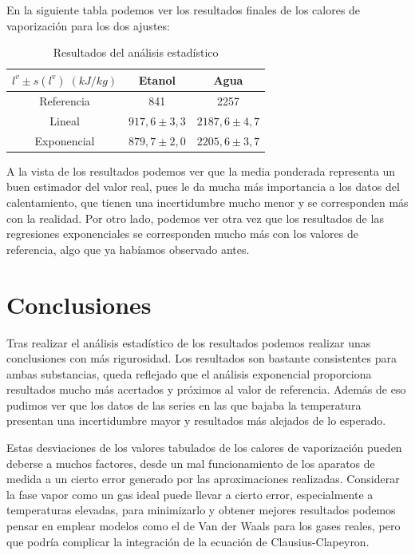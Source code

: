 \documentclass[a4paper,12pt,titlepage]{article}
\begin{document}
En la siguiente tabla podemos ver los resultados finales de los calores de vaporización para los dos ajustes:

\begin{table}[h!]
\centering
\begin{tabular}{|c|c|c|}
\hline
$l^v \pm s(l^v)\; (kJ/kg)$ & Etanol & Agua \\ \hline
Referencia       & 841 & 2257 \\ \hline
Lineal           & $917,6 \pm 3,3$ & $2187,6 \pm 4,7$ \\ \hline
Exponencial      & $879,7 \pm 2,0$ & $2205,6 \pm 3,7$ \\ \hline
\end{tabular}
\caption{Resultados del análisis estadístico}
\label{tab:my-table}
\end{table}

A la vista de los resultados podemos ver que la media ponderada representa un buen estimador del valor real, pues le da mucha más importancia a los datos del calentamiento, que tienen una incertidumbre mucho menor y se corresponden más con la realidad. Por otro lado, podemos ver otra vez que los resultados de las regresiones exponenciales se corresponden mucho más con los valores de referencia, algo que ya habíamos observado antes.


\section{Conclusiones}

Tras realizar el análisis estadístico de los resultados podemos realizar unas conclusiones con más rigurosidad. Los resultados son bastante consistentes para ambas substancias, queda reflejado que el análisis exponencial proporciona resultados mucho más acertados y próximos al valor de referencia. Además de eso pudimos ver que los datos de las series en las que bajaba la temperatura presentan una incertidumbre mayor y resultados más alejados de lo esperado.

Estas desviaciones de los valores tabulados de los calores de vaporización pueden deberse a muchos factores, desde un mal funcionamiento de los aparatos de medida a un cierto error generado por las aproximaciones realizadas. Considerar la fase vapor como un gas ideal puede llevar a cierto error, especialmente a temperaturas elevadas, para minimizarlo y obtener mejores resultados podemos pensar en emplear modelos como el de Van der Waals para los gases reales, pero que podría complicar la integración de la ecuación de Clausius-Clapeyron.
\end{document}
